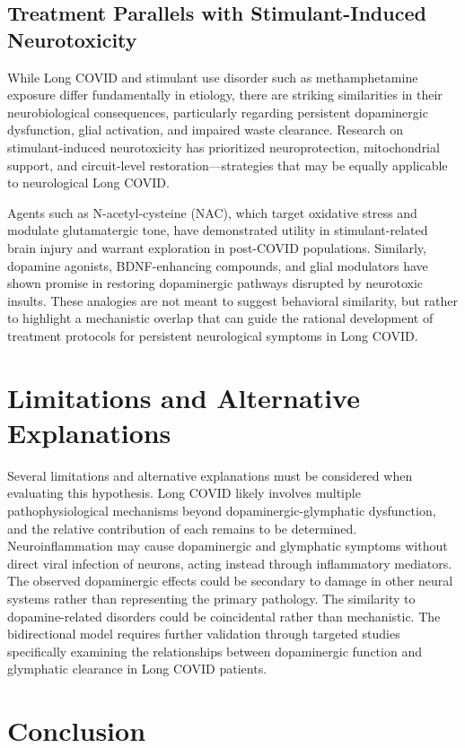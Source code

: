 \documentclass[12pt]{article}
\begin{document}
\subsection*{Treatment Parallels with Stimulant-Induced Neurotoxicity}

While Long COVID and stimulant use disorder such as methamphetamine exposure differ fundamentally in etiology, there are striking similarities in their neurobiological consequences, particularly regarding persistent dopaminergic dysfunction, glial activation, and impaired waste clearance. Research on stimulant-induced neurotoxicity has prioritized neuroprotection, mitochondrial support, and circuit-level restoration—strategies that may be equally applicable to neurological Long COVID.

Agents such as N-acetyl-cysteine (NAC), which target oxidative stress and modulate glutamatergic tone, have demonstrated utility in stimulant-related brain injury and warrant exploration in post-COVID populations. Similarly, dopamine agonists, BDNF-enhancing compounds, and glial modulators have shown promise in restoring dopaminergic pathways disrupted by neurotoxic insults. These analogies are not meant to suggest behavioral similarity, but rather to highlight a mechanistic overlap that can guide the rational development of treatment protocols for persistent neurological symptoms in Long COVID.

\section{Limitations and Alternative Explanations}

Several limitations and alternative explanations must be considered when evaluating this hypothesis. Long COVID likely involves multiple pathophysiological mechanisms beyond dopaminergic-glymphatic dysfunction, and the relative contribution of each remains to be determined. Neuroinflammation may cause dopaminergic and glymphatic symptoms without direct viral infection of neurons, acting instead through inflammatory mediators. The observed dopaminergic effects could be secondary to damage in other neural systems rather than representing the primary pathology. The similarity to dopamine-related disorders could be coincidental rather than mechanistic. The bidirectional model requires further validation through targeted studies specifically examining the relationships between dopaminergic function and glymphatic clearance in Long COVID patients.

\section{Conclusion}
\end{document}
